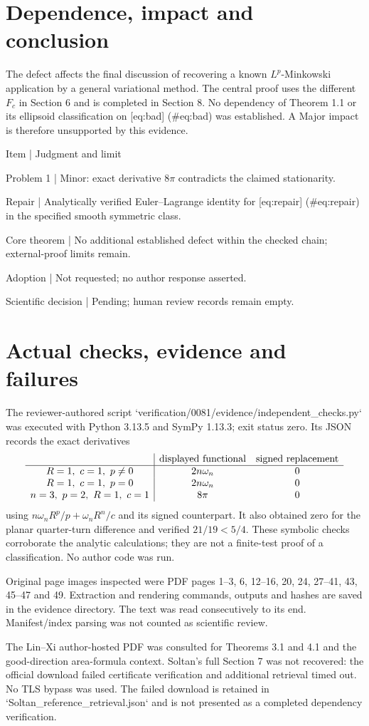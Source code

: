 \documentclass[10pt]{article}
\begin{document}
\section*{Dependence, impact and conclusion}
The defect affects the final discussion of recovering a known \(L^p\)-Minkowski application by a general variational method. The central proof uses the different \(F_c\) in Section 6 and is completed in Section 8. No dependency of Theorem 1.1 or its ellipsoid classification on [eq:bad] (\#eq:bad) was established. A Major impact is therefore unsupported by this evidence.\par
Item | Judgment and limit\par
Problem 1 | Minor: exact derivative \(8\pi\) contradicts the claimed stationarity.\par
Repair | Analytically verified Euler–Lagrange identity for [eq:repair] (\#eq:repair) in the specified smooth symmetric class.\par
Core theorem | No additional established defect within the checked chain; external-proof limits remain.\par
Adoption | Not requested; no author response asserted.\par
Scientific decision | Pending; human review records remain empty.\par
\section*{Actual checks, evidence and failures}
The reviewer-authored script `verification/0081/evidence/independent\_checks.py` was executed with Python 3.13.5 and SymPy 1.13.3; exit status zero. Its JSON records the exact derivatives \[\begin{array}{c|cc}
 &\hbox{displayed functional}&\hbox{signed replacement}\\ \hline
 R=1,\ c=1,\ p\ne0&2n\omega_n&0\\
 R=1,\ c=1,\ p=0&2n\omega_n&0\\
 n=3,\ p=2,\ R=1,\ c=1&8\pi&0
 \end{array}\] using \(n\omega_nR^p/p+\omega_nR^n/c\) and its signed counterpart. It also obtained zero for the planar quarter-turn difference and verified \(21/19<5/4\). These symbolic checks corroborate the analytic calculations; they are not a finite-test proof of a classification. No author code was run.\par
Original page images inspected were PDF pages 1–3, 6, 12–16, 20, 24, 27–41, 43, 45–47 and 49. Extraction and rendering commands, outputs and hashes are saved in the evidence directory. The text was read consecutively to its end. Manifest/index parsing was not counted as scientific review.\par
The Lin–Xi author-hosted PDF was consulted for Theorems 3.1 and 4.1 and the good-direction area-formula context. Soltan’s full Section 7 was not recovered: the official download failed certificate verification and additional retrieval timed out. No TLS bypass was used. The failed download is retained in `Soltan\_reference\_retrieval.json` and is not presented as a completed dependency verification.\par
\end{document}
